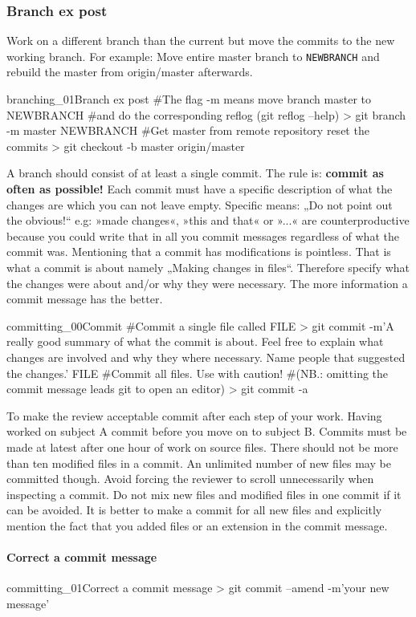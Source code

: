 \subsubsection{Branch ex post}
Work on a different branch than the current but move the commits to the new working branch. For example: Move entire master branch to \texttt{NEWBRANCH} and rebuild the master from origin/master afterwards. 
\begin{codelisting}{branching_01}{Branch ex post}
#The flag -m means move branch master to NEWBRANCH
#and do the corresponding reflog (git reflog --help)
> git branch -m master NEWBRANCH
#Get master from remote repository reset the commits
> git checkout -b master origin/master
\end{codelisting}
A branch should consist of at least a single commit. The rule is: \textbf{commit as often as possible!} Each commit must have a specific description of what the changes are which you can not leave empty. Specific means: „Do not point out the obvious!“ e.g: »made changes«, »this and that« or »...« are counterproductive because you could write that in all you commit messages regardless of what the commit was. Mentioning that a commit has modifications is pointless. That is what a commit is about namely „Making changes in files“. Therefore specify what the changes were about and/or why they were necessary.  The more information a commit message has the better.
\begin{codelisting}{committing_00}{Commit}
#Commit a single file called FILE
> git commit -m'A really good summary of what the commit is about. Feel free to explain what changes are involved and why they where necessary. Name people that suggested the changes.' FILE
#Commit all files. Use with caution!
#(NB.: omitting the commit message leads git to open an editor)
> git commit -a
\end{codelisting}
To make the review acceptable commit after each step of your work. Having worked on subject A commit before you move on to subject B. Commits must be made at latest after one hour of work on source files. There should not be more than ten modified files in a commit. An unlimited number of new files may be committed though. Avoid forcing the reviewer to scroll unnecessarily when inspecting a commit. Do not mix new files and modified files in one commit if it can be avoided. It is better to make a commit for all new files and explicitly mention the fact that you added files or an extension in the commit message.
\paragraph{Correct a commit message}
\begin{codelisting}{committing_01}{Correct a commit message}
> git commit --amend -m'your new message'
\end{codelisting}

